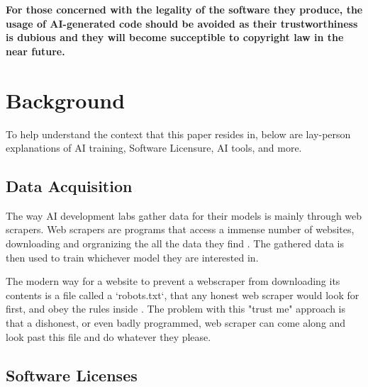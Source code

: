 \documentclass[journal]{IEEEtran}
\begin{document}
\textbf {
  For those concerned with the legality of the software they produce, the usage of
AI-generated code should be avoided as their trustworthiness is dubious and
they will become succeptible to copyright law in the near future.
}

\section{Background}

To help understand the context that this paper resides in, below are
lay-person explanations of AI training, Software Licensure, AI tools, and
more.

\subsection{Data Acquisition}

The way AI development labs gather data for their models is
mainly through web scrapers. Web scrapers are programs that access a
immense number of websites, downloading and orgranizing
the all the data they find \cite{Miquido}. The gathered data
is then used to train whichever model they are interested in. 

The modern way for a website to prevent a webscraper from
downloading its contents is a file called a `robots.txt`,
that any honest web scraper would look for first, and obey
the rules inside \cite{robots}. The problem with this "trust me" approach
is that a dishonest, or even badly programmed, web scraper
can come along and look past this file and do whatever they please\cite{robots}.



\subsection{Software Licenses}

\end{document}

